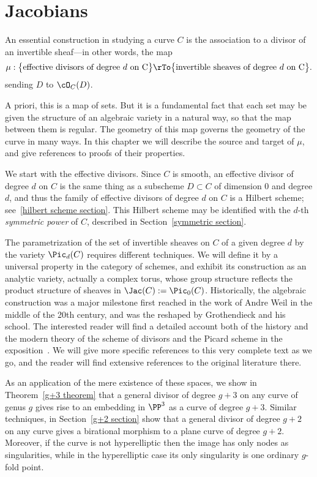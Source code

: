 

\chapter{Jacobians}\label{new Jacobians chapter}


An essential construction in studying a curve $C$ is the association to a divisor  of an invertible sheaf---in other words, the map
$$
\mu : \big\{ \text{effective divisors of degree $d$ on C}\big\} \rTo \big\{ \text{invertible sheaves of degree $d$ on C} \big\}.
$$
sending $D$ to $\cO_C(D)$.

A priori, this is a map of sets. But it is a fundamental fact that each set may  be given the structure of an algebraic variety in a natural way, so that the map between them is regular. The geometry of this map governs the geometry of the curve in many ways.
In this chapter we will describe the source and target of $\mu$, and give references to proofs of their properties. 

We start with the effective divisors. Since $C$ is smooth, an effective divisor of degree $d$ on $C$ is the same thing as a subscheme $D \subset C$ of dimension 0 and degree $d$, and thus
the family of effective divisors of degree $d$ on $C$ is a Hilbert scheme; see~\ref{hilbert scheme section}. This Hilbert scheme may be identified with
the $d$-th \emph{symmetric power}  of $C$, described in Section~\ref{symmetric section}. 

The parametrization of the set of invertible sheaves on $C$ of a given degree $d$ by the variety $\Pic_d(C)$ requires different techniques. We will define it by a universal property in the category of schemes, and exhibit its construction as an analytic variety, actually a complex torus, whose group structure reflects the product structure of
sheaves in $\Jac(C) := \Pic_0(C)$.
Historically, the algebraic construction was a major milestone first reached in the work of Andre Weil in the middle of
the 20th century, and was the reshaped by Grothendieck and his school. The interested reader will find a detailed account both of the history and the 
modern theory of the scheme of divisors and the Picard scheme in the exposition~\cite{Kleiman-PicardScheme}. We will give
more specific references to this very complete text as we go, and the reader will find extensive references to the original literature there.

As an application of the mere existence of these spaces, we show in Theorem~\ref{g+3 theorem} that a general divisor of degree $g+3$ on any curve of genus $g$ gives rise to an embedding in $\PP^3$ as a curve of degree $g+3$. Similar techniques, in Section~\ref{g+2 section} show that a general divisor of degree $g+2$ on any curve gives a birational morphism to a plane curve of degree $g+2$. Moreover, if the curve is not hyperelliptic then the image has  only nodes
as singularities, while in the hyperelliptic case its only singularity is one ordinary $g$-fold point. 


